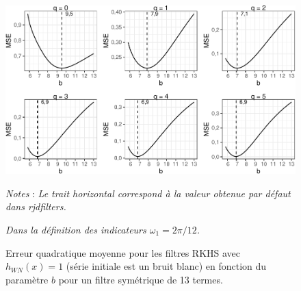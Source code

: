 \documentclass[
  11pt,
  french,
  a4paper]{article}
\newcommand\1{\mathds{1}}
\begin{document}
\begin{figure}[H]

{\centering \includegraphics{img/bookdown/pdf/rkhsoptimse6wn-1} 

}

\caption[Erreur quadratique moyenne pour les filtres RKHS avec \(h_{WN}(x)=1\) (série initiale est un bruit blanc) en fonction du paramètre \(b\) pour un filtre symétrique de 13 termes]{Erreur quadratique moyenne pour les filtres RKHS avec \(h_{WN}(x)=1\) (série initiale est un bruit blanc) en fonction du paramètre \(b\) pour un filtre symétrique de 13 termes.}\label{fig:rkhsoptimse6wn}

\footnotesize


\emph{Notes} : \emph{Le trait horizontal correspond à la valeur obtenue par défaut dans rjdfilters.}

\emph{Dans la définition des indicateurs \(\omega_1=2\pi/12\).}
\normalsize\end{figure}
\end{document}
